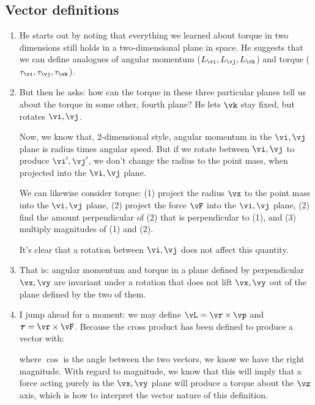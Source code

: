 \subsection{Vector definitions}

\begin{enumerate}
  \item He starts out by noting that everything we learned about torque
  in two dimensions still holds in a two-dimensional plane in space. He
  suggests that we can define analogues of angular momentum ($L_{\vi},
  L_{\vj}, L_{\vk}$) and torque ($\tau_{\vi}, \tau_{\vj}, \tau_{\vk}$).

  \item But then he asks: how can the torque in these three particular
  planes tell us about the torque in some other, fourth plane? He lets
  $\vk$ stay fixed, but rotates $\vi, \vj$.

  Now, we know that, 2-dimensional style, angular momentum in the $\vi,
  \vj$ plane is radius times angular speed. But if we rotate between
  $\vi, \vj$ to produce $\vi', \vj'$, we don't change the radius to the
  point mass, when projected into the $\vi, \vj$ plane.

  We can likewise consider torque: (1) project the radius $\vx$ to the
  point mass into the $\vi, \vj$ plane, (2) project the force $\vF$ into
  the $\vi, \vj$ plane, (2) find the amount perpendicular of (2) that is
  perpendicular to (1), and (3) multiply magnitudes of (1) and (2).

  It's clear that a rotation between $\vi, \vj$ does not affect this
  quantity.

  \item That is: angular momentum and torque in a plane defined by
  perpendicular $\vx, \vy$ are invariant under a rotation that does not
  lift $\vx, \vy$ out of the plane defined by the two of them.

  \item I jump ahead for a moment: we may define $\vL = \vr \cross \vp$
  and $\vtau = \vr \cross \vF$. Because the cross product has been
  defined to produce a vector with:

  \begin{nedqn}
    \norm{\vr \cross \vp}
  \eqcol
    \abs{\cos\theta} \norm{\vr} \norm{\vp}
  \end{nedqn}

  \noindent
  where $\cos$ is the angle between the two vectors, we know we have the
  right magnitude. With regard to magnitude, we know that this will
  imply that a force acting purely in the $\vx, \vy$ plane will produce
  a torque about the $\vz$ axis, which is how to interpret the vector
  nature of this definition.


\end{enumerate}
